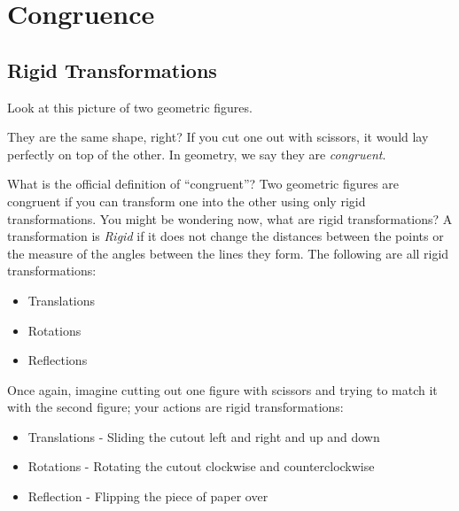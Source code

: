 \chapter{Congruence}
\section{Rigid Transformations}

Look at this picture of two geometric figures.


They are the same shape, right? If you cut one out with scissors, it
would lay perfectly on top of the other. In geometry, we say they are
\emph{congruent}.

What is the official definition of ``congruent''? 
Two geometric figures are congruent if you can transform one into the other using
only rigid transformations. 
You might be wondering now, what are rigid transformations?
A transformation is \emph{Rigid} if it does not change the distances
between the points or the measure of the angles between the lines they
form. The following are all rigid transformations:
\begin{itemize}
\item Translations
\item Rotations
\item Reflections 
\end{itemize}

Once again, imagine cutting out one figure with scissors and trying to match it with the second figure; your actions are rigid transformations:
\begin{itemize}
\item Translations - Sliding the cutout left and right and up and down
\item Rotations	- Rotating the cutout clockwise and counterclockwise
\item Reflection - Flipping the piece of paper over
\end{itemize}

